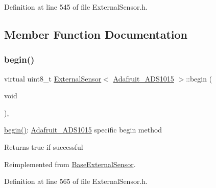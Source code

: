 Definition at line 545 of file External\+Sensor.\+h.



\subsection{Member Function Documentation}
\mbox{\label{class_external_sensor_3_01_adafruit___a_d_s1015_01_4_adb62166ec1ff937acd82650ff44320d6}} 
\subsubsection{\texorpdfstring{begin()}{begin()}}
{\footnotesize\ttfamily virtual uint8\+\_\+t \hyperlink{class_external_sensor}{External\+Sensor}$<$ \hyperlink{class_adafruit___a_d_s1015}{Adafruit\+\_\+\+A\+D\+S1015} $>$\+::begin (\begin{DoxyParamCaption}\item[{void}]{ }\end{DoxyParamCaption})\hspace{0.3cm}{\ttfamily [inline]}, {\ttfamily [virtual]}}

\hyperlink{class_external_sensor_3_01_adafruit___a_d_s1015_01_4_adb62166ec1ff937acd82650ff44320d6}{begin()}\+: \hyperlink{class_adafruit___a_d_s1015}{Adafruit\+\_\+\+A\+D\+S1015} specific begin method

\begin{DoxyReturn}{Returns}
true if successful 
\end{DoxyReturn}


Reimplemented from \hyperlink{class_base_external_sensor_a87d132803d4f4fdd4e66332809f0c9a0}{Base\+External\+Sensor}.



Definition at line 565 of file External\+Sensor.\+h.

\mbox{\label{class_external_sensor_3_01_adafruit___a_d_s1015_01_4_a6c41a80525743b24bcc64744bbfb91bb}} 
